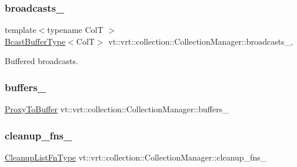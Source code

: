 \subsubsection{\texorpdfstring{broadcasts\+\_\+}{broadcasts\_}}
{\footnotesize\ttfamily template$<$typename ColT $>$ \\
\hyperlink{structvt_1_1vrt_1_1collection_1_1_collection_manager_af3a8c8a3c37301a98aa62f265858a3c0}{Bcast\+Buffer\+Type}$<$ColT$>$ vt\+::vrt\+::collection\+::\+Collection\+Manager\+::broadcasts\+\_\+\hspace{0.3cm}{\ttfamily [static]}, {\ttfamily [private]}}



Buffered broadcasts. 

\mbox{\label{structvt_1_1vrt_1_1collection_1_1_collection_manager_aca3063c9343d57284746de0d9f1d9613}} 
\subsubsection{\texorpdfstring{buffers\+\_\+}{buffers\_}}
{\footnotesize\ttfamily \hyperlink{structvt_1_1vrt_1_1collection_1_1_collection_manager_a8229b3026c5790ed0783bd34c404e359}{Proxy\+To\+Buffer} vt\+::vrt\+::collection\+::\+Collection\+Manager\+::buffers\+\_\+\hspace{0.3cm}{\ttfamily [private]}}

\mbox{\label{structvt_1_1vrt_1_1collection_1_1_collection_manager_a5123370561fb8eb70ef7c4979e051706}} 
\subsubsection{\texorpdfstring{cleanup\+\_\+fns\+\_\+}{cleanup\_fns\_}}
{\footnotesize\ttfamily \hyperlink{structvt_1_1vrt_1_1collection_1_1_collection_manager_a735e54bc5a8646536d07750e2549a156}{Cleanup\+List\+Fn\+Type} vt\+::vrt\+::collection\+::\+Collection\+Manager\+::cleanup\+\_\+fns\+\_\+\hspace{0.3cm}{\ttfamily [private]}}

